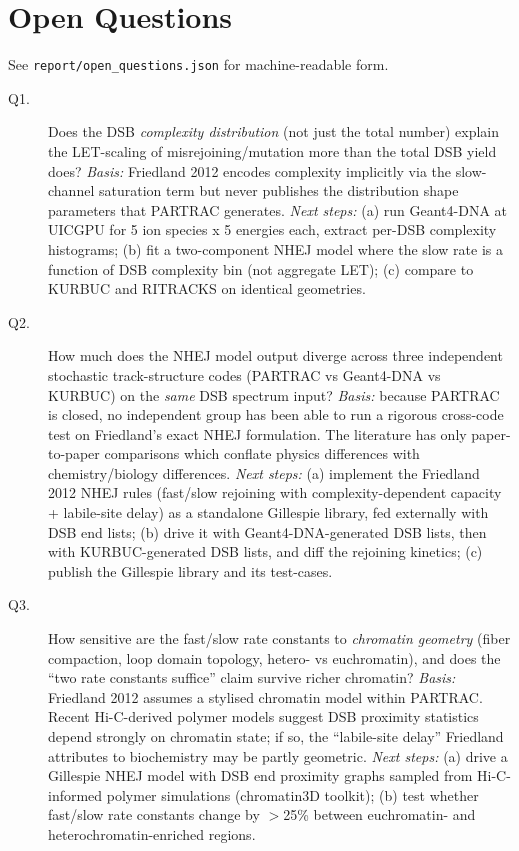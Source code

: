 \documentclass[11pt]{article}
\begin{document}
\section{Open Questions}
See \texttt{report/open\_questions.json} for machine-readable form.
\begin{description}
\item[Q1.] Does the DSB \emph{complexity distribution} (not just the total
number) explain the LET-scaling of misrejoining/mutation more than the
total DSB yield does? \emph{Basis:} Friedland 2012 encodes complexity
implicitly via the slow-channel saturation term but never publishes the
distribution shape parameters that PARTRAC generates. \emph{Next steps:}
(a) run Geant4-DNA at UICGPU for 5 ion species x 5 energies each, extract
per-DSB complexity histograms; (b) fit a two-component NHEJ model where
the slow rate is a function of DSB complexity bin (not aggregate LET); (c)
compare to KURBUC and RITRACKS on identical geometries.

\item[Q2.] How much does the NHEJ model output diverge across three
independent stochastic track-structure codes (PARTRAC vs Geant4-DNA vs
KURBUC) on the \emph{same} DSB spectrum input? \emph{Basis:} because
PARTRAC is closed, no independent group has been able to run a rigorous
cross-code test on Friedland's exact NHEJ formulation. The literature has
only paper-to-paper comparisons which conflate physics differences with
chemistry/biology differences. \emph{Next steps:} (a) implement the
Friedland 2012 NHEJ rules (fast/slow rejoining with complexity-dependent
capacity + labile-site delay) as a standalone Gillespie library, fed
externally with DSB end lists; (b) drive it with Geant4-DNA-generated DSB
lists, then with KURBUC-generated DSB lists, and diff the rejoining
kinetics; (c) publish the Gillespie library and its test-cases.

\item[Q3.] How sensitive are the fast/slow rate constants to \emph{chromatin
geometry} (fiber compaction, loop domain topology, hetero- vs
euchromatin), and does the ``two rate constants suffice'' claim survive
richer chromatin? \emph{Basis:} Friedland 2012 assumes a stylised chromatin
model within PARTRAC. Recent Hi-C-derived polymer models suggest DSB
proximity statistics depend strongly on chromatin state; if so, the
``labile-site delay'' Friedland attributes to biochemistry may be partly
geometric. \emph{Next steps:} (a) drive a Gillespie NHEJ model with DSB end
proximity graphs sampled from Hi-C-informed polymer simulations
(chromatin3D toolkit); (b) test whether fast/slow rate constants change by
$>$25\% between euchromatin- and heterochromatin-enriched regions.


\end{description}
\end{document}
